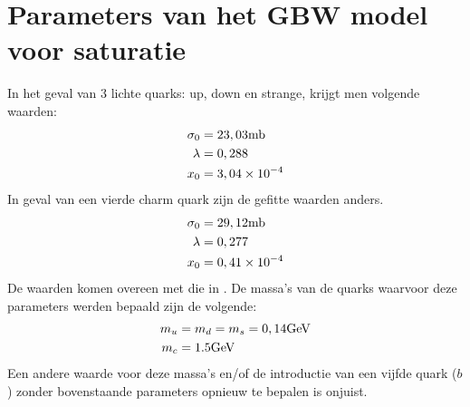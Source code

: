 \documentclass[a4paper,11pt]{article}
\numberwithin{equation}{section} %
\begin{document}
\section{Parameters van het GBW model voor saturatie} \label{app:GBWParameters}
In het geval van 3 lichte quarks: up, down en strange, krijgt men volgende waarden:
\begin{align}
\sigma_0 &= 23,03 \text{mb} \notag \\
\lambda &= 0,288 \\
x_0 &= 3,04 \times 10^{-4} \notag
\end{align}
In geval van een vierde charm quark zijn de gefitte waarden anders.
\begin{align}
\sigma_0 &= 29,12 \text{mb} \notag \\
\lambda &= 0,277 \\
x_0 &= 0,41 \times 10^{-4} \notag
\end{align}
De waarden komen overeen met die in \cite{GBW}.
De massa’s van de quarks waarvoor deze parameters werden bepaald zijn de volgende:
\begin{align}
m_u &= m_d = m_s = 0,14 \text{GeV}\notag \\
m_c &= 1.5 \text{GeV}
\end{align}
Een andere waarde voor deze massa’s en/of de introductie van een vijfde quark ($b$) zonder bovenstaande parameters opnieuw te bepalen is onjuist.
\end{document}
